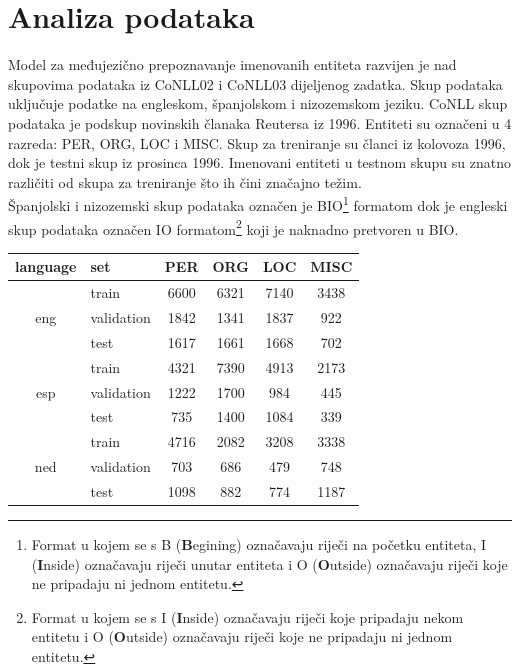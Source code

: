 \documentclass[times, utf8, seminar]{fer}
\begin{document}
\chapter{Analiza podataka}
Model za međujezično prepoznavanje imenovanih entiteta razvijen je nad skupovima podataka iz CoNLL02 i CoNLL03 dijeljenog zadatka. Skup podataka uključuje podatke na engleskom, španjolskom i nizozemskom jeziku. CoNLL skup podataka je podskup novinskih članaka Reutersa iz 1996. Entiteti su označeni u 4 razreda: PER, ORG, LOC i MISC. Skup za treniranje su članci iz kolovoza 1996, dok je testni skup iz prosinca 1996. Imenovani entiteti u testnom skupu su znatno različiti od skupa za treniranje što ih čini značajno težim.\citep{Ratinov:2009:DCM:1596374.1596399} \\
\indent Španjolski i nizozemski skup podataka označen je BIO\footnote{Format u kojem se s B (\textbf{B}egining) označavaju riječi na početku entiteta, I (\textbf{I}nside) označavaju riječi unutar entiteta i O (\textbf{O}utside) označavaju riječi koje ne pripadaju ni jednom entitetu.} formatom dok je engleski skup podataka označen IO formatom\footnote{Format u kojem se s I (\textbf{I}nside) označavaju riječi koje pripadaju nekom entitetu i O (\textbf{O}utside) označavaju riječi koje ne pripadaju ni jednom entitetu.} koji je naknadno pretvoren u BIO.
\begin{center}
\begin{tabular}{ clcccc }
\hline
\textbf{language} & \textbf{set} & \textbf{PER} & \textbf{ORG} & \textbf{LOC} & \textbf{MISC} \\ \hline
\multirow{3}{*}{eng} & train & 6600 & 6321 & 7140 & 3438 \\
 & validation & 1842 & 1341 & 1837 & 922 \\
 & test & 1617 & 1661 & 1668 & 702 \\ \hline
\multirow{3}{*}{esp} & train & 4321 & 7390 & 4913 & 2173 \\
 & validation & 1222 & 1700 & 984 & 445\\
 & test & 735 & 1400 & 1084  & 339 \\ \hline
\multirow{3}{*}{ned} & train & 4716 & 2082 & 3208 & 3338 \\
 & validation & 703 & 686 & 479 & 748 \\
 & test & 1098 & 882 & 774 & 1187 \\ \hline
\end{tabular}
\end{center}
\end{document}
